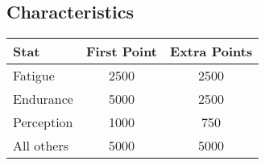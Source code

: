 \begin{multicols}{2}
\subsection{Characteristics}
\label{epcosts:stats}

\begin{tabularx}{\linewidth}{Xcc}
\textbf{Stat} & \textbf{First Point} & \textbf{Extra Points} \\ \hline
Fatigue		& 2500 & 2500 \\ \hline
Endurance	& 5000 & 2500 \\ \hline
Perception	& 1000 & 750 \\ \hline
All others	& 5000 & 5000 \\ \hline
\end{tabularx}

\end{multicols}

